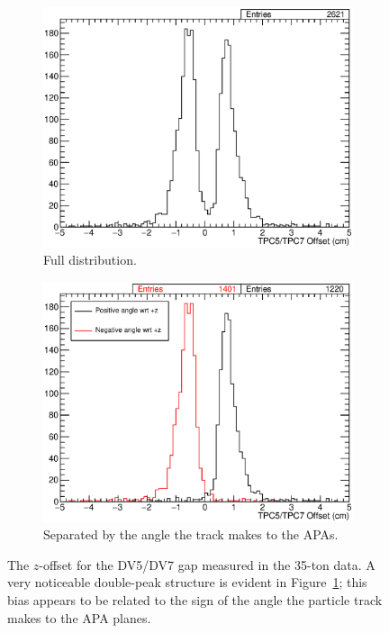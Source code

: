 \begin{figure}
  \centering
  \begin{subfigure}[t]{\linewidth}
    \centering
    \includegraphics[width=12cm]{TPC5TPC7Gap.eps}
    \caption{Full distribution.}
    \label{fig:DV5DV7Gap}
  \end{subfigure}
  \hfill
  \begin{subfigure}[t]{\linewidth}
    \centering
    \includegraphics[width=12cm]{TPC5TPC7GapAngle.eps}
    \caption{Separated by the angle the track makes to the APAs.}
    \label{fig:DV5DV7GapAngle}
  \end{subfigure}
  \caption[The $z$-offset for the DV5/DV7 gap measured in the 35-ton data.]{The $z$-offset for the DV5/DV7 gap measured in the 35-ton data.  A very noticeable double-peak structure is evident in Figure~\ref{fig:DV5DV7Gap}; this bias appears to be related to the sign of the angle the particle track makes to the APA planes.}
  \label{fig:DV5DV7XOffsetZOffset}
\end{figure}

